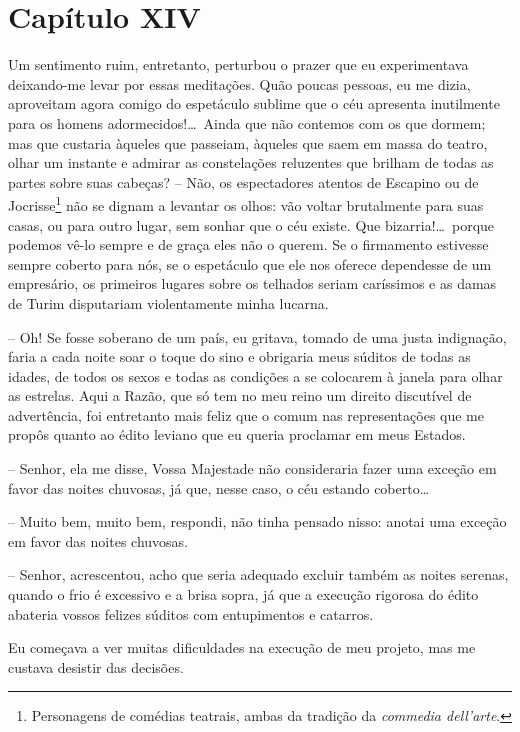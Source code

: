 \section*{Capítulo XIV}

 Um sentimento ruim, entretanto, perturbou o prazer que eu experimentava
deixando-me levar por essas meditações. Quão poucas pessoas, eu me
dizia, aproveitam agora comigo do espetáculo sublime que o céu
apresenta inutilmente para os homens adormecidos!\ldots\ Ainda que não
contemos com os que dormem; mas que custaria àqueles que passeiam,
àqueles que saem em massa do teatro, olhar um instante e admirar as
constelações reluzentes que brilham de todas as partes sobre suas
cabeças? -- Não, os espectadores atentos de Escapino ou de
Jocrisse\footnote{ Personagens de comédias teatrais, ambas da tradição
da \textit{commedia dell’arte}.} não se dignam a levantar os olhos:
vão voltar brutalmente para suas casas, ou para outro lugar, sem sonhar
que o céu existe. Que bizarria!\ldots\ porque podemos vê-lo sempre e de
graça eles não o querem. Se o firmamento estivesse sempre coberto para
nós, se o espetáculo que ele nos oferece dependesse de um empresário,
os primeiros lugares sobre os telhados seriam caríssimos e as damas de
Turim disputariam violentamente minha lucarna.

 -- Oh! Se fosse soberano de um país, eu gritava, tomado de uma justa
indignação, faria a cada noite soar o toque do sino e obrigaria meus
súditos de todas as idades, de todos os sexos e todas as condições a se
colocarem à janela para olhar as estrelas. Aqui a Razão, que só tem no
meu reino um direito discutível de advertência, foi entretanto mais
feliz que o comum nas representações que me propôs quanto ao édito
leviano que eu queria proclamar em meus Estados. 

-- Senhor, ela me disse, Vossa Majestade não consideraria fazer uma
exceção em favor das noites chuvosas, já que, nesse caso, o céu estando
coberto\ldots\ 

-- Muito bem, muito bem, respondi, não tinha pensado nisso: anotai uma
exceção em favor das noites chuvosas. 

-- Senhor, acrescentou, acho que seria adequado excluir também as
noites serenas, quando o frio é excessivo e a brisa sopra, já que a
execução rigorosa do édito abateria vossos felizes súditos com
entupimentos e catarros. 

Eu começava a ver muitas dificuldades na execução de meu projeto, mas me
custava desistir das decisões. 

